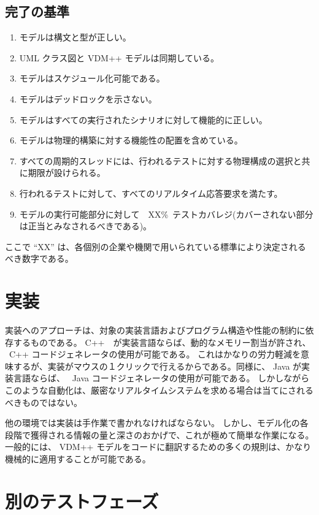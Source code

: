 \documentclass[\pformat,12pt]{jreport}
\begin{document}
\subsection{完了の基準}

\begin{enumerate}
\item モデルは構文と型が正しい。
\item UML クラス図と VDM++ モデルは同期している。
\item モデルはスケジュール化可能である。
\item モデルはデッドロックを示さない。
\item モデルはすべての実行されたシナリオに対して機能的に正しい。
\item モデルは物理的構築に対する機能性の配置を含めている。
\item すべての周期的スレッドには、行われるテストに対する物理構成の選択と共に期限が設けられる。
\item 行われるテストに対して、すべてのリアルタイム応答要求を満たす。
\item モデルの実行可能部分に対して　XX\%\ テストカバレジ(カバーされない部分は正当とみなされるべきである)。
\end{enumerate}

ここで ``XX'' は、各個別の企業や機関で用いられている標準により決定されるべき数字である。

\section{実装}

実装へのアプローチは、対象の実装言語およびプログラム構造や性能の制約に依存するものである。
C++　が実装言語ならば、動的なメモリー割当が許され、 \VDMTools\ C++ コードジェネレータの使用が可能である。
これはかなりの労力軽減を意味するが、実装がマウスの１クリックで行えるからである。同様に、 Java が実装言語ならば、 \VDMTools\ Java コードジェネレータの使用が可能である。
しかしながらこのような自動化は、厳密なリアルタイムシステムを求める場合は当てにされるべきものではない。

他の環境では実装は手作業で書かれなければならない。
しかし、モデル化の各段階で獲得される情報の量と深さのおかげで、これが極めて簡単な作業になる。
一般的には、 VDM++ モデルをコードに翻訳するための多くの規則は、かなり機械的に適用することが可能である。

\section{別のテストフェーズ}\label{sec:tests}
\end{document}

